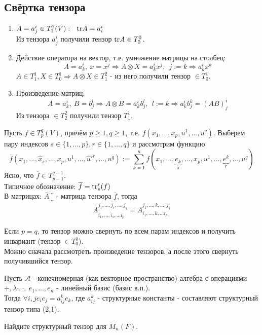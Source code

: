 \subsection{Свёртка тензора}
\begin{example}
    \begin{enumerate}
        \item $A = a^i_j \in T_1^1(V): \ \ \textup{tr} A = a_i^i$\\
        Из тензора $a^i_j$ получили тензор $\textup{tr} A \in T_0^0$.
        \item Действие оператора на вектор, т.е. умножение матрицы на столбец:
        \[A = a^i_k, \ x = x^j \Longrightarrow A \otimes X = a^i_kx^j, \ \ j := k \Longrightarrow a^i_kx^k\]
        $A \in T_1^1, X \in T^1_0 \Longrightarrow A \otimes X \in T^2_1$ - из него получили тензор $\in T^1_0$.
        \item Произведение матриц:
        \[A = a^i_k, \ B = b^l_j \Longrightarrow A \otimes B = a^i_kb^l_j, \ \ l := k \Longrightarrow a^i_kb^k_j = (AB)^i_j\]
        Из тензора $\in T^2_2$ получили тензор $T^1_1$.
    \end{enumerate}
\end{example}
\begin{definition}
    Пусть $f \in T^q_p(V)$, причём $p \geqslant 1, q \geqslant 1$, т.е. $f(x_1,...,x_p, u^1,...,u^q)$. Выберем пару индексов $s \in \{1,...,p\}, r\in \{1,...,q\}$ и рассмотрим функцию 
    \[\overline{f}(x_1,...,\hat{x}_s,...,x_p,u^1,...,\hat{u}'^r,...,u^q) := \sum \limits_{k=1}^n f(x_1,...,\underbrace{e_k}_{s},...,x_p,u^1,...,\underbrace{e^k}_{r},...,u^q)\] 
    Ясно, что $\overline{f} \in T^{q-1}_{p-1}$.\\
    Типичное обозначение: $\overline{f} = \textup{tr}_s^r(f)$\\
    В матрицах: $\overline{A}_{...}^{...}$ - матрица тензора $\overline{f}$, тогда
    \[\overline{A}_{i_1,...,\hat{i}_s,...i_p}^{j_1,...,\hat{j}_r,...,j_q} = A_{i_1,...,k,...i_p}^{j_1,...,k,...,j_q}\]
\end{definition}
Если $p=q$, то тензор можно свернуть по всем парам индексов и получить инвариант (тензор $\in T_0^0$).\\
Можно сначала рассмотреть произведение тензоров, а после этого свернуть получившийся тензор.
\begin{example1}
    Пусть $\mathcal{A}$ - конечномерная (как векторное пространство) алгебра с операциями $+, \lambda\cdot, \cdot, \ e_1,...,e_n$ - линейный базис (базис в.п.).\\
    Тогда $\forall i,j e_ie_j = a_{ij}^ke_k$, где $a_{ij}^k$ - структурные константы - составляют структурный тензор типа (2,1).
\end{example1}
\begin{exercise}
    Найдите структурный тензор для $M_n(F)$.
\end{exercise}
